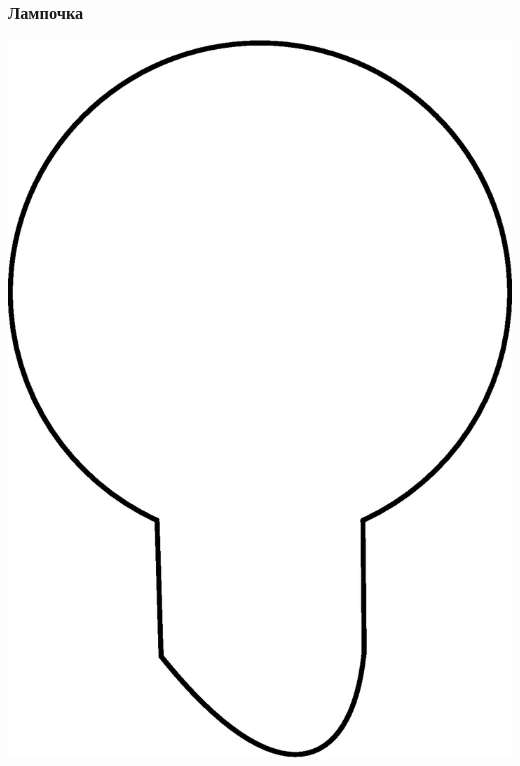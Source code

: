 \documentclass[aspectratio=169]{beamer}
\begin{document}
\begin{frame}[t]
  \frametitle{Лампочка}
  \begin{center}
    \includegraphics[scale=0.3]{img/part2_1_bulb.eps}
  \end{center}
\end{frame}
\end{document}
